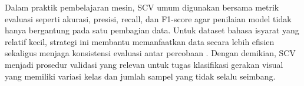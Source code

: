 Dalam praktik pembelajaran mesin, SCV umum digunakan bersama metrik evaluasi seperti akurasi, presisi, recall, dan F1-score agar penilaian model tidak hanya bergantung pada satu pembagian data. Untuk dataset bahasa isyarat yang relatif kecil, strategi ini membantu memanfaatkan data secara lebih efisien sekaligus menjaga konsistensi evaluasi antar percobaan \cite{Raschka2020}. Dengan demikian, SCV menjadi prosedur validasi yang relevan untuk tugas klasifikasi gerakan visual yang memiliki variasi kelas dan jumlah sampel yang tidak selalu seimbang.
